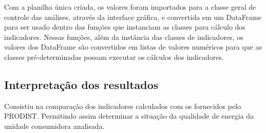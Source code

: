 Com a planilha única criada, os valores foram importados para a classe geral de controle das análises, através da interface gráfica, e convertida em um DataFrame para ser usado dentro das funções que instanciam as classes para cálculo dos indicadores. Nessas funções, além da instância das classes de indicadores, os valores dos DataFrame são convertidos em listas de valores numéricos para que as classes pré-determinadas possam executar os cálculos dos indicadores.

\subsection{Interpretação dos resultados}

Consistiu na comparação dos indicadores calculados com os fornecidos pelo PRODIST. Permitindo assim determinar a situação da qualidade de energia da unidade consumidora analisada.
